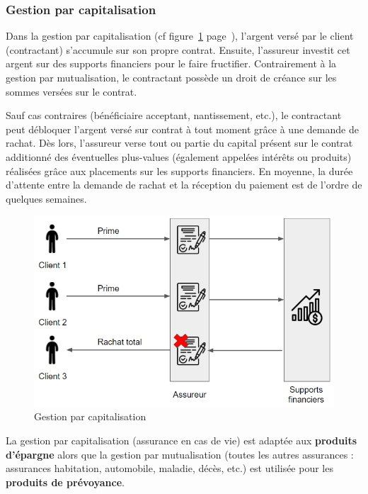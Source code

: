 \documentclass{article}
\newcommand{\blackFrame}[2]{
    \begin{tcolorbox}[colback=white,colframe=black!100!white,title={#1}]
        #2
    \end{tcolorbox}
}
\begin{document}
\subsubsection{Gestion par capitalisation}
Dans la gestion par capitalisation (cf figure~\ref{gestion_capitalisation} page~\pageref{gestion_capitalisation}), l'argent versé par le client (contractant) s'accumule sur son propre contrat. Ensuite, l'assureur investit cet argent sur des supports financiers pour le faire fructifier. Contrairement à la gestion par mutualisation, le contractant possède un droit de créance sur les sommes versées sur le contrat.

Sauf cas contraires (bénéficiaire acceptant, nantissement, etc.), le contractant peut débloquer l'argent versé sur contrat à tout moment grâce à une demande de rachat. Dès lors, l'assureur verse tout ou partie du capital présent sur le contrat additionné des éventuelles plus-values (également appelées intérêts ou produits) réalisées grâce aux placements sur les supports financiers. En moyenne, la durée d'attente entre la demande de rachat et la réception du paiement est de l'ordre de quelques semaines.

\begin{figure}[h!]
    \includegraphics[width=\textwidth]{gestion_capitalisation.PNG}
    \caption{\label{gestion_capitalisation} Gestion par capitalisation
    }
\end{figure}

\blackFrame{Résumé}{
La gestion par capitalisation (assurance en cas de vie) est adaptée aux \textbf{produits d'épargne} alors que la gestion par mutualisation (toutes les autres assurances : assurances habitation, automobile, maladie, décès, etc.) est utilisée pour les \textbf{produits de prévoyance}.
}
\end{document}
